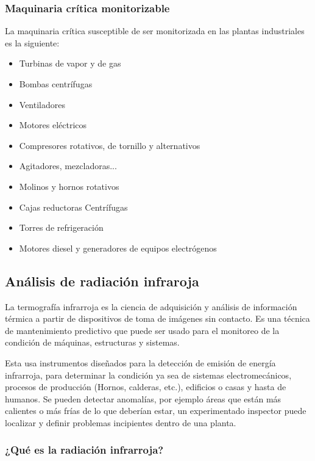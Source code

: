 \documentclass[../main]{subfiles}
\begin{document}
\subsubsection{Maquinaria crítica monitorizable} 
La maquinaria crítica susceptible de ser monitorizada en las plantas industriales es la siguiente:
\begin{itemize}
\item Turbinas de vapor y de gas
\item Bombas centrífugas
\item Ventiladores
\item Motores eléctricos
\item Compresores rotativos, de tornillo y alternativos
\item Agitadores, mezcladoras...
\item Molinos y hornos rotativos
\item Cajas reductoras Centrífugas
\item Torres de refrigeración
\item Motores diesel y generadores de equipos electrógenos
\end{itemize}





\subsection{Análisis de radiación infraroja}



La termografía infrarroja es la ciencia de adquisición y análisis de información térmica a partir de dispositivos de toma de imágenes sin contacto. Es una técnica de mantenimiento predictivo que puede ser usado para el monitoreo de la condición de máquinas, estructuras y sistemas.

Esta usa instrumentos diseñados para la detección de emisión de energía infrarroja, para determinar la condición ya sea de sistemas electromecánicos, procesos de producción (Hornos, calderas, etc.), edificios o casas y hasta de humanos.
Se pueden detectar anomalías, por ejemplo áreas que están más calientes o más frías de lo que deberían estar, un experimentado inspector puede localizar y definir problemas incipientes dentro de una planta.

\subsubsection{¿Qué es la radiación infrarroja?}
\end{document}
